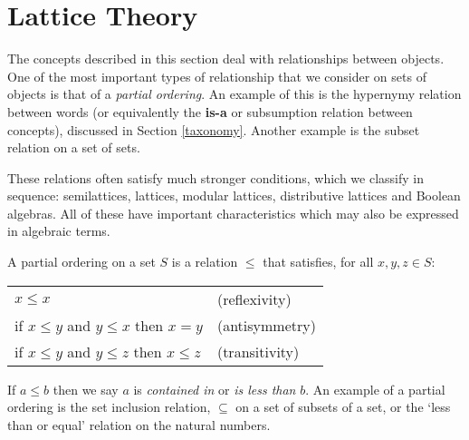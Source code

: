\section{Lattice Theory}
\label{lattices}

The concepts described in this section deal with relationships between objects. One of the most important types of relationship that we consider on sets of objects is that of a \emph{partial ordering}. An example of this is the hypernymy relation between words (or equivalently the \textbf{is-a} or subsumption relation between concepts), discussed in Section \ref{taxonomy}. Another example is the subset relation on a set of sets.

These relations often satisfy much stronger conditions, which we classify in sequence: semilattices, lattices, modular lattices, distributive lattices and Boolean algebras. All of these have important characteristics which may also be expressed in algebraic terms.


\begin{defn}
A partial ordering on a set $S$ is a relation $\le$ that satisfies, for all $x,y,z \in S$:
\begin{center}
\begin{tabular}{ll}
$x \le x$ & (reflexivity)\\
if $x \le y$ and $y \le x$ then $x = y$ & (antisymmetry) \\
if $x \le y$ and $y \le z$ then $x \le z$ & (transitivity)
\end{tabular}
\end{center}
\end{defn}
If $a \le b$ then we say $a$ is \emph{contained in} or \emph{is less than} $b$. An example of a partial ordering is the set inclusion relation, $\subseteq$ on a set of subsets of a set, or the `less than or equal' relation on the natural numbers.

